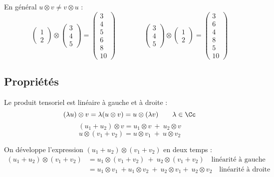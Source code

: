 \documentclass[11pt,class=report,crop=false]{standalone}
\begin{document}
En général $u \otimes v \neq v \otimes u$ :
$$\begin{pmatrix}1\\2\end{pmatrix} \otimes \begin{pmatrix}3\\4\\5\end{pmatrix}
= \begin{pmatrix}3\\4\\5\\6\\8\\10\end{pmatrix}
\qquad\qquad
\begin{pmatrix}3\\4\\5\end{pmatrix} \otimes \begin{pmatrix}1\\2\end{pmatrix}
= \begin{pmatrix}3\\6\\4\\8\\5\\10\end{pmatrix}$$


\subsection{Propriétés}

\begin{proposition}
Le produit tensoriel est linéaire à gauche et à droite :
$$(\lambda u) \otimes v = \lambda (u \otimes v) = u \otimes (\lambda v) \qquad \lambda\in\Cc$$
$$(u_1+u_2) \otimes v = u_1 \otimes v \  + \  u_2 \otimes v$$
$$u \otimes (v_1+v_2) = u \otimes v_1 \ + \  u \otimes v_2$$
\end{proposition}

\begin{exemple}
On développe l'expression $(u_1+u_2)\otimes(v_1+v_2)$ en deux temps :
\begin{align*}
(u_1+u_2)\otimes(v_1+v_2) 
  &= u_1 \otimes(v_1+v_2) \  + \ u_2\otimes(v_1+v_2)  \quad \text{linéarité à gauche} \\
  &= u_1 \otimes v_1 \  +u_1 \otimes v_2 \  + \ u_2\otimes v_1 + \ u_2\otimes v_2  \quad \text{linéarité à droite} \\
\end{align*}
\end{exemple}
\end{document}
